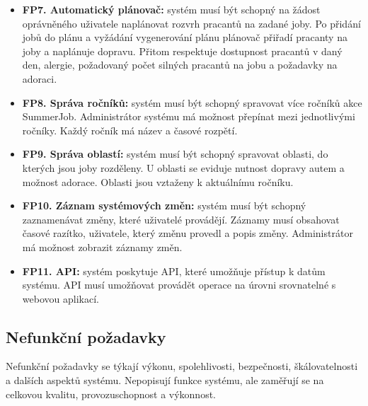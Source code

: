 \begin{itemize}
    \item \textbf{FP7. Automatický plánovač:} systém musí být schopný na žádost oprávněného uživatele naplánovat rozvrh pracantů na zadané joby. Po přidání jobů do plánu a vyžádání vygenerování plánu plánovač přiřadí pracanty na joby a naplánuje dopravu. Přitom respektuje dostupnost pracantů v daný den, alergie, požadovaný počet silných pracantů na jobu a požadavky na adoraci.
    \item \textbf{FP8. Správa ročníků:} systém musí být schopný spravovat více ročníků akce SummerJob. Administrátor systému má možnost přepínat mezi jednotlivými ročníky. Každý ročník má název a časové rozpětí.
    \item \textbf{FP9. Správa oblastí:} systém musí být schopný spravovat oblasti, do kterých jsou joby rozděleny. U oblasti se eviduje nutnost dopravy autem a možnost adorace. Oblasti jsou vztaženy k aktuálnímu ročníku.
    \item \textbf{FP10. Záznam systémových změn:} systém musí být schopný zaznamenávat změny, které uživatelé provádějí. Záznamy musí obsahovat časové razítko, uživatele, který změnu provedl a popis změny. Administrátor má možnost zobrazit záznamy změn.
    \item \textbf{FP11. API:} systém poskytuje API, které umožňuje přístup k datům systému. API musí umožňovat provádět operace na úrovni srovnatelné s webovou aplikací.
\end{itemize}

\subsection{Nefunkční požadavky}
\label{sec:nonfunctional-requirements}

Nefunkční požadavky se týkají výkonu, spolehlivosti, bezpečnosti, škálovatelnosti a dalších aspektů systému. Nepopisují funkce systému, ale zaměřují se na celkovou kvalitu, provozuschopnost a výkonnost.

